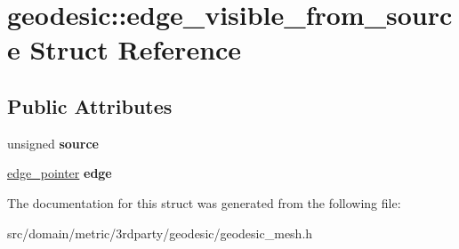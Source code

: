 \hypertarget{structgeodesic_1_1edge__visible__from__source}{}\section{geodesic\+:\+:edge\+\_\+visible\+\_\+from\+\_\+source Struct Reference}
\label{structgeodesic_1_1edge__visible__from__source}
\subsection*{Public Attributes}
\begin{DoxyCompactItemize}
\item 
\hypertarget{structgeodesic_1_1edge__visible__from__source_a288acfdd8aba7d6eaebde69d1c19ee9b}{}unsigned {\bfseries source}\label{structgeodesic_1_1edge__visible__from__source_a288acfdd8aba7d6eaebde69d1c19ee9b}

\item 
\hypertarget{structgeodesic_1_1edge__visible__from__source_a5509a26ed330e5ba07748c8d3f8ef8a7}{}\hyperlink{classgeodesic_1_1_edge}{edge\+\_\+pointer} {\bfseries edge}\label{structgeodesic_1_1edge__visible__from__source_a5509a26ed330e5ba07748c8d3f8ef8a7}

\end{DoxyCompactItemize}


The documentation for this struct was generated from the following file\+:\begin{DoxyCompactItemize}
\item 
src/domain/metric/3rdparty/geodesic/geodesic\+\_\+mesh.\+h\end{DoxyCompactItemize}
